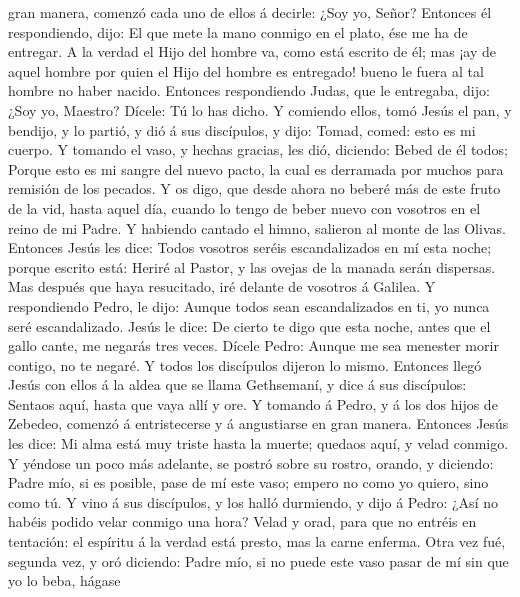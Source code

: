 gran manera, comenzó cada uno de ellos á decirle: ¿Soy yo, Señor?
 Entonces él respondiendo, dijo: El que mete la mano
conmigo en el plato, ése me ha de entregar.  A la verdad
el Hijo del hombre va, como está escrito de él; mas ¡ay de aquel hombre
por quien el Hijo del hombre es entregado! bueno le fuera al tal hombre
no haber nacido.  Entonces respondiendo Judas, que le
entregaba, dijo: ¿Soy yo, Maestro? Dícele: Tú lo has dicho.
 Y comiendo ellos, tomó Jesús el pan, y bendijo, y lo
partió, y dió á sus discípulos, y dijo: Tomad, comed: esto es mi cuerpo.
 Y tomando el vaso, y hechas gracias, les dió, diciendo:
Bebed de él todos;  Porque esto es mi sangre del nuevo
pacto, la cual es derramada por muchos para remisión de los pecados.
 Y os digo, que desde ahora no beberé más de este fruto
de la vid, hasta aquel día, cuando lo tengo de beber nuevo con vosotros
en el reino de mi Padre.  Y habiendo cantado el himno,
salieron al monte de las Olivas.  Entonces Jesús les
dice: Todos vosotros seréis escandalizados en mí esta noche; porque
escrito está: Heriré al Pastor, y las ovejas de la manada serán
dispersas.  Mas después que haya resucitado, iré delante
de vosotros á Galilea.  Y respondiendo Pedro, le dijo:
Aunque todos sean escandalizados en ti, yo nunca seré escandalizado.
 Jesús le dice: De cierto te digo que esta noche, antes
que el gallo cante, me negarás tres veces.  Dícele Pedro:
Aunque me sea menester morir contigo, no te negaré. Y todos los
discípulos dijeron lo mismo.  Entonces llegó Jesús con
ellos á la aldea que se llama Gethsemaní, y dice á sus discípulos:
Sentaos aquí, hasta que vaya allí y ore.  Y tomando á
Pedro, y á los dos hijos de Zebedeo, comenzó á entristecerse y á
angustiarse en gran manera.  Entonces Jesús les dice: Mi
alma está muy triste hasta la muerte; quedaos aquí, y velad conmigo.
 Y yéndose un poco más adelante, se postró sobre su
rostro, orando, y diciendo: Padre mío, si es posible, pase de mí este
vaso; empero no como yo quiero, sino como tú.  Y vino á
sus discípulos, y los halló durmiendo, y dijo á Pedro: ¿Así no habéis
podido velar conmigo una hora?  Velad y orad, para que no
entréis en tentación: el espíritu á la verdad está presto, mas la carne
enferma.  Otra vez fué, segunda vez, y oró diciendo:
Padre mío, si no puede este vaso pasar de mí sin que yo lo beba, hágase
